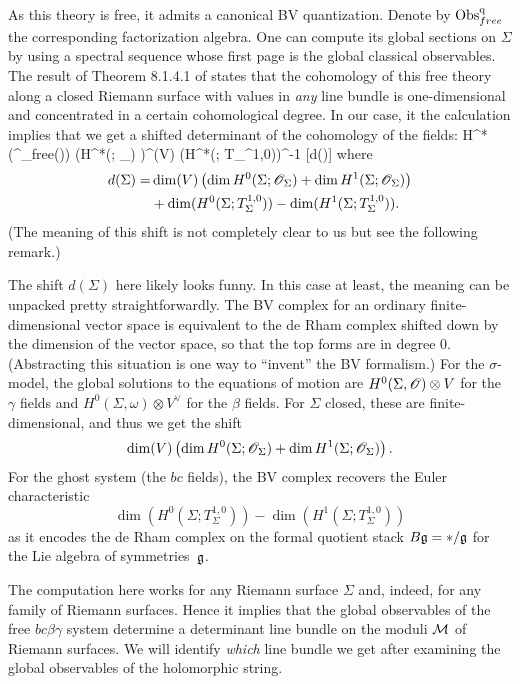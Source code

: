 As this theory is free, it admits a canonical BV quantization.
Denote by ${\rm Obs}^{{\rm q}}_{free}$ the corresponding factorization algebra.
One can compute its global sections on $\Sigma$ by using a spectral sequence whose first page is the global classical observables.
The result of Theorem 8.1.4.1 of \cite{CG1} states that the cohomology of this free theory along a closed Riemann surface with values in {\em any} line bundle is one-dimensional and concentrated in a certain cohomological degree. 
In our case, it the calculation implies that we get a shifted determinant of the cohomology of the fields:
\ben
H^*\left(\Obs^\q_{free}(\Sigma)\right) \cong \det \left(H^*(\Sigma ; \sO_\Sigma) \right)^{\tensor \dim(V)} \tensor \det \left(H^*(\Sigma ; T_\Sigma^{1,0})\right)^{-1} [d(\Sigma)] 
\een
where 
\begin{align*}
d(\Sigma) = & \dim (V)  \left(\dim H^0(\Sigma ; \mathscr O_\Sigma) + \dim H^1(\Sigma ; \mathscr O_\Sigma)\right) \\
&+ \dim(H^0(\Sigma ; T_\Sigma^{1,0})) - \dim(H^1(\Sigma ; T_\Sigma^{1,0})).
\end{align*}
(The meaning of this shift is not completely clear to us but see the following remark.)

\begin{rmk}
The shift $d(\Sigma)$ here likely looks funny.
In this case at least, the meaning can be unpacked pretty straightforwardly. 
The BV complex for an ordinary finite-dimensional vector space is equivalent to the de Rham complex shifted down by the dimension of the vector space, 
so that the top forms are in degree 0.
(Abstracting this situation is one way to ``invent'' the BV formalism.)
For the $\sigma$-model, the global solutions to the equations of motion are $H^0(\Sigma,\mathscr O) \otimes V$ for the $\gamma$ fields and $H^0(\Sigma,\omega) \otimes V^\vee$ for the $\beta$ fields.
For $\Sigma$ closed, these are finite-dimensional, and thus we get the shift
\[
 \dim (V)  \left(\dim H^0(\Sigma ; \mathscr O_\Sigma) + \dim H^1(\Sigma ; \mathscr O_\Sigma)\right).
\]
For the ghost system (the $bc$ fields), 
the BV complex recovers the Euler characteristic 
\[
\dim(H^0(\Sigma ; T_\Sigma^{1,0})) - \dim(H^1(\Sigma ; T_\Sigma^{1,0}))
\]
as it encodes the de Rham complex on the formal quotient stack $B\mathfrak g = \ast/\mathfrak g$ for the Lie algebra of symmetries~$\mathfrak g$.
\end{rmk}

The computation here works for any Riemann surface $\Sigma$ and, indeed, for any family of Riemann surfaces.
Hence it implies that the global observables of the free $bc\beta\gamma$ system determine a determinant line bundle on the moduli $\mathcal M$ of Riemann surfaces.
We will identify {\em which} line bundle we get after examining the global observables of the holomorphic string.


